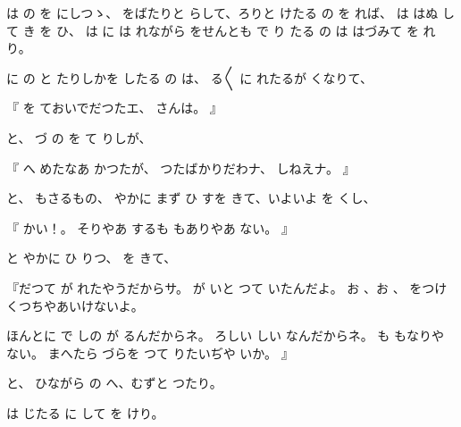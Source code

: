 は
の
を
にしつゝ、
をばたりと
らして、ろりと
けたる
の
を
れば、
は
はぬ
して
き
を
ひ、
は
に
は
れながら
をせんとも
で
り
たる
の
は
はづみて
を
れり。

に
の
と
たりしかを
したる
の
は、
る〳〵
に
れたるが
くなりて、

『
を
ておいでだつたエ、
さんは。
』

と、
づ
の
を
て
りしが、

『
へ
めたなあ
かつたが、
つたばかりだわナ、
しねえナ。
』

と、
もさるもの、
やかに
まず
ひ
すを
きて、いよいよ
を
くし、

『
かい！。
そりやあ
するも
もありやあ
ない。
』

と
やかに
ひ
りつ、
を
きて、

『だつて
が
れたやうだからサ。
が
いと
つて
いたんだよ。
お
、お
、
をつけ
くつちやあいけないよ。

ほんとに
で
しの
が
るんだからネ。
ろしい
しい
なんだからネ。
も
もなりや
ない。
まへたら
づらを
つて
りたいぢや
いか。
』

と、
ひながら
の
へ、むずと
つたり。

は
じたる
に
して
を
けり。

